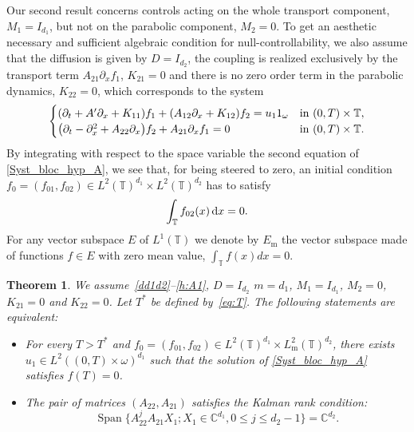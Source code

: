 \documentclass[JEP,XML,SOM,Unicode,NoEqCountersInSection]{cedram}
\theoremstyle{plain}
\newtheorem{theorem}{Theorem}
\theoremstyle{definition}
\theoremstyle{remark}
\DeclareMathOperator{\Span}{Span}
\newcommand{\diff}[1][-3]{\ensuremath{\mathop{}\mkern#1mu\mathrm{d}}}
\newcommand{\set}{\mathbb}
\renewcommand{\C}{\set{C}}
\newcommand{\T}{\set{T}}
\newcommand{\m}{{\mathrm m}}
\let\originalleft\left
\let\originalright\right
\renewcommand{\left}{\mathopen{}\mathclose\bgroup\originalleft}
\renewcommand{\right}{\aftergroup\egroup\originalright}
\begin{document}
Our second result concerns controls acting on the whole transport component, $M_1=I_{d_1}$, but not on the parabolic component, $M_2=0$.
To get an aesthetic necessary and sufficient algebraic condition for null-controllability, we also assume that the diffusion is given by $D=I_{d_2}$, the coupling is realized exclusively by the transport term $A_{21}\partial_x f_1$, \ie $K_{21}=0$ and there is no zero order term in the parabolic dynamics, \ie $K_{22}=0$, which corresponds to the system
\begin{equation} \label{Syst_bloc_hyp_A}
\begin{cases}
\left(\partial_t +A'\partial_x+K_{11}\right)f_1+\left(A_{12}\partial_x+K_{12}\right)f_2= u_1 1_\omega
&\text{in}\ (0,T)\times \T,\!\\
\left(\partial_t - \partial_x^2+A_{22}\partial_x\right)f_2 + A_{21}\partial_x f_1 = 0 &\text{in}\ (0,T)\times \T.
\end{cases}
\end{equation}
By integrating with respect to the space variable the second equation of \eqref{Syst_bloc_hyp_A}, we see that, for being steered to zero, an initial condition $f_0=(f_{01},f_{02})\in L^2(\T)^{d_1} \times L^2(\T)^{d_2}$ has to satisfy
\begin{equation} \label{Hyp_A_contrainte}
\int_{\T} f_{02}(x) \diff x =0.
\end{equation}
For any vector subspace $E$ of $L^1(\T)$ we denote by $E_\m$ the vector subspace made of functions $f\in E$ with zero mean value, \ie $\int_{\T} f(x)dx =0$.

\begin{theorem}\label{th:main_2}
We assume~\eqref{dd1d2}--\eqref{h:A1}, $D=I_{d_2}$ $m=d_1$, $M_1=I_{d_1}$, $M_2=0$, $K_{21}=0$ and $K_{22}=0$. Let $T^\ast$ be defined by~\eqref{eq:T}.
The following statements are equivalent:
\begin{itemize}
\item For every $T>T^{\ast}$ and $f_0=(f_{01},f_{02})\in L^2(\T)^{d_1} \times L^2_\m(\T)^{d_2}$, there exists $u_1 \in L^2((0,T)\times\omega)^{d_1}$ such that the solution of \eqref{Syst_bloc_hyp_A} satisfies $f(T)=0$.
\item The pair of matrices $(A_{22},A_{21})$ satisfies the Kalman rank condition:
\begin{equation} \label{Kalman_Thm2}
\Span \{ A_{22}^j A_{21} X_1 ; X_1 \in \C^{d_1}, 0 \leq j \leq d_2-1 \} = \C^{d_2}.
\end{equation}
\end{itemize}
\end{theorem}
\end{document}
